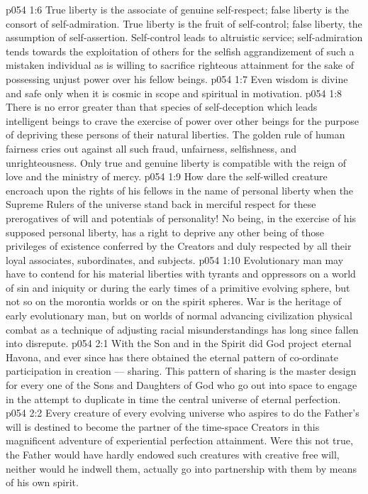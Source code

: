 \vs p054 1:6 True liberty is the associate of genuine self\hyp{}respect; false liberty is the consort of self\hyp{}admiration. True liberty is the fruit of self\hyp{}control; false liberty, the assumption of self\hyp{}assertion. Self\hyp{}control leads to altruistic service; self\hyp{}admiration tends towards the exploitation of others for the selfish aggrandizement of such a mistaken individual as is willing to sacrifice righteous attainment for the sake of possessing unjust power over his fellow beings.
\vs p054 1:7 \pc Even wisdom is divine and safe only when it is cosmic in scope and spiritual in motivation.
\vs p054 1:8 \pc There is no error greater than that species of self\hyp{}deception which leads intelligent beings to crave the exercise of power over other beings for the purpose of depriving these persons of their natural liberties. The golden rule of human fairness cries out against all such fraud, unfairness, selfishness, and unrighteousness. Only true and genuine liberty is compatible with the reign of love and the ministry of mercy.
\vs p054 1:9 How dare the self\hyp{}willed creature encroach upon the rights of his fellows in the name of personal liberty when the Supreme Rulers of the universe stand back in merciful respect for these prerogatives of will and potentials of personality! No being, in the exercise of his supposed personal liberty, has a right to deprive any other being of those privileges of existence conferred by the Creators and duly respected by all their loyal associates, subordinates, and subjects.
\vs p054 1:10 Evolutionary man may have to contend for his material liberties with tyrants and oppressors on a world of sin and iniquity or during the early times of a primitive evolving sphere, but not so on the morontia worlds or on the spirit spheres. War is the heritage of early evolutionary man, but on worlds of normal advancing civilization physical combat as a technique of adjusting racial misunderstandings has long since fallen into disrepute.
\vs p054 2:1 With the Son and in the Spirit did God project eternal Havona, and ever since has there obtained the eternal pattern of co\hyp{}ordinate participation in creation --- sharing. This pattern of sharing is the master design for every one of the Sons and Daughters of God who go out into space to engage in the attempt to duplicate in time the central universe of eternal perfection.
\vs p054 2:2 Every creature of every evolving universe who aspires to do the Father’s will is destined to become the partner of the time\hyp{}space Creators in this magnificent adventure of experiential perfection attainment. Were this not true, the Father would have hardly endowed such creatures with creative free will, neither would he indwell them, actually go into partnership with them by means of his own spirit.

